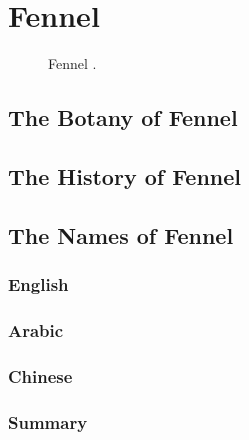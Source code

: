 \section{Fennel}
\label{sec:fennel}



\begin{figure}[!ht]
	\vspace{-4ex}
	\centering
	\caption{Fennel \textit{}.}
	\label{fig:fennel_imgs}
\end{figure}

\subsection{The Botany of Fennel}

\subsection{The History of Fennel}

\subsection{The Names of Fennel}

\subsubsection{English}





\subsubsection{Arabic}



\subsubsection{Chinese}



\subsubsection{Summary}

